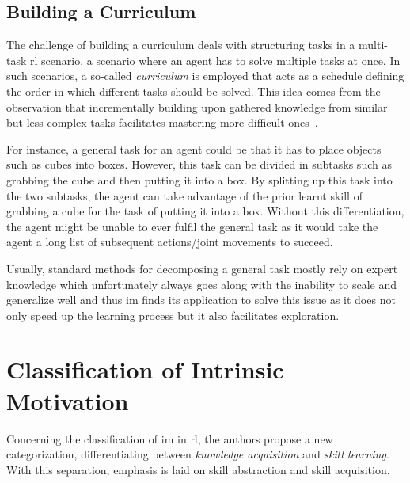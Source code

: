 \documentclass[draft,final]{vutinfth} %
\begin{document}
    \subsection{Building a Curriculum}\label{subsec:building-a-curriculum}
    The challenge of building a curriculum deals with structuring tasks in a multi-task \gls{rl} scenario, a scenario where an agent has to solve multiple tasks at once.
    In such scenarios, a so-called \textit{curriculum} is employed that acts as a schedule defining the order in which different tasks should be solved.
    This idea comes from the observation that incrementally building upon gathered knowledge from similar but less complex tasks facilitates mastering more difficult ones~\citep{aubret_survey_2019}.

    For instance, a general task for an agent could be that it has to place objects such as cubes into boxes.
    However, this task can be divided in subtasks such as grabbing the cube and then putting it into a box.
    By splitting up this task into the two subtasks, the agent can take advantage of the prior learnt skill of grabbing a cube for the task of putting it into a box.
    Without this differentiation, the agent might be unable to ever fulfil the general task as it would take the agent a long list of subsequent actions/joint movements to succeed.

    Usually, standard methods for decomposing a general task mostly rely on expert knowledge which unfortunately always goes along with the inability to scale and generalize well and thus \gls{im} finds its application to solve this issue as it does not only speed up the learning process but it also facilitates exploration.


    \section{Classification of Intrinsic Motivation}

    Concerning the classification of \gls{im} in \gls{rl}, the authors \citeauthor{aubret_survey_2019} propose a new categorization, differentiating between \textit{knowledge acquisition} and \textit{skill learning}.
    With this separation, emphasis is laid on skill abstraction and skill acquisition.
\end{document}
